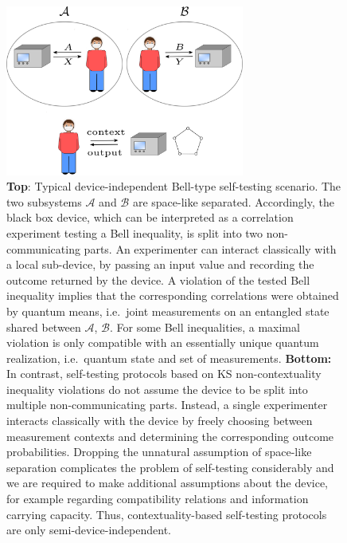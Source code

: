 \begin{figure}
    \centering
    \includegraphics[width=0.70\textwidth]{images/self-testing.png}
    \caption{\textbf{Top}: Typical device-independent Bell-type self-testing scenario. The two subsystems $\mathcal{A}$ and $\mathcal{B}$ are space-like separated. Accordingly, the black box device, which can be interpreted as a correlation experiment testing a Bell inequality, is split into two non-communicating parts. An experimenter can interact classically with a local sub-device, by passing an input value and recording the outcome returned by the device. A violation of the tested Bell inequality implies that the corresponding correlations were obtained by quantum means, i.e.\ joint measurements on an entangled state shared between $\mathcal{A}$, $\mathcal{B}$. For some Bell inequalities, a maximal violation is only compatible with an essentially unique quantum realization, i.e.\ quantum state and set of measurements.
    \textbf{Bottom:} In contrast, self-testing protocols based on KS non-contextuality inequality violations do not assume the device to be split into multiple non-communicating parts. Instead, a single experimenter interacts classically with the device by freely choosing between measurement contexts and determining the corresponding outcome probabilities. Dropping the unnatural assumption of space-like separation complicates the problem of self-testing considerably and we are required to make additional assumptions about the device, for example regarding compatibility relations and information carrying capacity. Thus, contextuality-based self-testing protocols are only semi-device-independent.}
    \label{fig:selftesting}
\end{figure}
